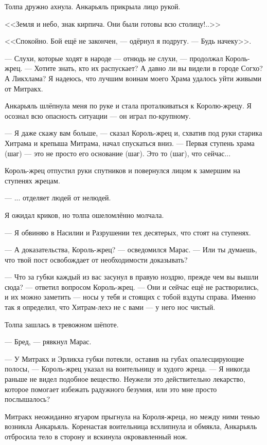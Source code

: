 Толпа дружно ахнула.
Анкарьяль прикрыла лицо рукой.

<<Земля и небо, знак кирпича.
Они были готовы всю столицу!..>>

<<Спокойно.
Бой ещё не закончен, --- одёрнул я подругу.
--- Будь начеку>>.

--- Слухи, которые ходят в народе --- отнюдь не слухи, --- продолжал Король-жрец.
--- Хотите знать, кто их распускает?
А давно ли вы видели в городе Согхо?
А Ликхлама?
Я надеюсь, что лучшим воинам моего Храма удалось уйти живыми от Митракх.

Анкарьяль шлёпнула меня по руке и стала проталкиваться к Королю-жрецу.
Я осознал всю опасность ситуации --- он играл по-крупному.

--- Я даже скажу вам больше, --- сказал Король-жрец и, схватив под руки старика Хитрама и крепыша Митрама, начал спускаться вниз.
--- Первая ступень храма (шаг) --- это не просто его основание (шаг).
Это то (шаг), что сейчас...

Король-жрец отпустил руки спутников и повернулся лицом к замершим на ступенях жрецам.

--- ... отделяет людей от нелюдей.

Я ожидал криков, но толпа ошеломлённо молчала.

--- Я обвиняю в Насилии и Разрушении тех десятерых, что стоят на ступенях.

--- А доказательства, Король-жрец? --- осведомился Марас.
--- Или ты думаешь, что твой пост освобождает от необходимости доказывать?

--- Что за губки каждый из вас засунул в правую ноздрю, прежде чем вы вышли сюда? --- ответил вопросом Король-жрец.
--- Они и сейчас ещё не растворились, и их можно заметить --- носы у тебя и стоящих с тобой вздуты справа.
Именно так я определил, что Хитрам-лехэ не с вами --- у него нос чистый.

Толпа зашлась в тревожном шёпоте.

--- Бред, --- рявкнул Марас.

--- У Митракх и Эрликха губки потекли, оставив на губах опалесцирующие полосы, --- Король-жрец указал на воительницу и худого жреца.
--- Я никогда раньше не видел подобное вещество.
Неужели это действительно лекарство, которое помогает избежать радужного безумия, или это мне просто послышалось?

Митракх неожиданно ягуаром прыгнула на Короля-жреца, но между ними тенью возникла Анкарьяль.
Коренастая воительница всхлипнула и обмякла, Анкарьяль отбросила тело в сторону и вскинула окровавленный нож.

